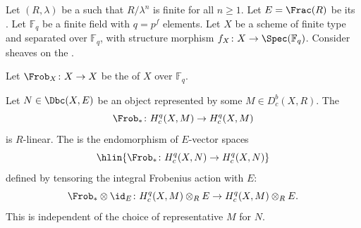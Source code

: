 \begin{definition} \label{definition:frobenius_action_on_compactly_supported_lambda_adic_cohomology_with_rational_coefficients}
    Let $(R, \lambda)$ be a   such that $R/\lambda^n$ is finite for all $n \geq 1$. Let $E = \Frac(R)$ be its . Let $\mathbb{F}_q$ be a finite field with $q = p^f$ elements. Let $X$ be a scheme of finite type and separated over $\mathbb{F}_q$, with structure morphism $f_X \colon X \to \Spec(\mathbb{F}_q)$. Consider sheaves on the .

    Let $\Frob_X \colon X \to X$ be the  of $X$ over $\mathbb{F}_q$.

    Let $N \in \Dbc(X, E)$ be an object represented by some $M \in D_c^b(X, R)$. The 
    $$\Frob_* \colon H_c^q(X, M) \to H_c^q(X, M)$$
    is $R$-linear. The  is the endomorphism of $E$-vector spaces
    $$\hlin{\Frob_* \colon H_c^q(X, N) \to H_c^q(X, N)}$$
    defined by tensoring the integral Frobenius action with $E$:
    $$\Frob_* \otimes \id_E \colon H_c^q(X, M) \otimes_R E \to H_c^q(X, M) \otimes_R E.$$
    This is independent of the choice of representative $M$ for $N$.
\end{definition}
